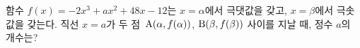 함수 $f(x)=-2x^3+ax^2+48x-12$는 $x=\alpha$에서 극댓값을 갖고, $x=\beta$에서 극솟값을 갖는다. 직선 $x=a$가 두 점~$\mathrm{A}(\alpha{,}\mkern3mu\mathopen{}f(\alpha))$, $\mathrm{B}(\beta{,}\mkern3mu\mathopen{}f(\beta))$ 사이를 지날 때, 정수 $a$의 개수는?

